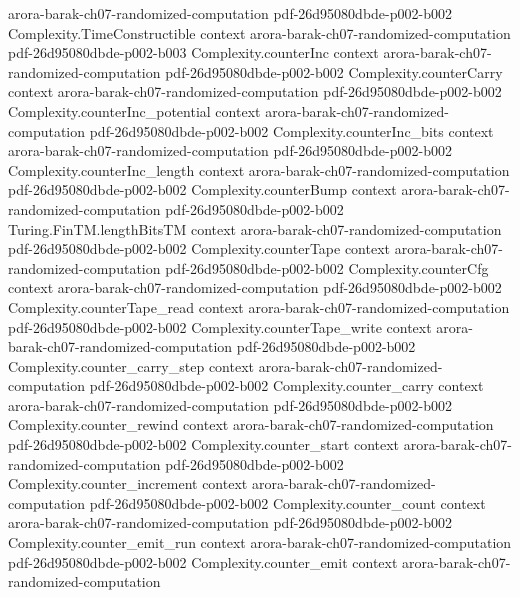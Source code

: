 \begin{theorem}
  {arora-barak-ch07-randomized-computation}
  {pdf-26d95080dbde-p002-b002}
\proofstep
  {Complexity.TimeConstructible}
  {context}
  {arora-barak-ch07-randomized-computation}
  {pdf-26d95080dbde-p002-b003}
\proofstep
  {Complexity.counterInc}
  {context}
  {arora-barak-ch07-randomized-computation}
  {pdf-26d95080dbde-p002-b002}
\proofstep
  {Complexity.counterCarry}
  {context}
  {arora-barak-ch07-randomized-computation}
  {pdf-26d95080dbde-p002-b002}
\proofstep
  {Complexity.counterInc_potential}
  {context}
  {arora-barak-ch07-randomized-computation}
  {pdf-26d95080dbde-p002-b002}
\proofstep
  {Complexity.counterInc_bits}
  {context}
  {arora-barak-ch07-randomized-computation}
  {pdf-26d95080dbde-p002-b002}
\proofstep
  {Complexity.counterInc_length}
  {context}
  {arora-barak-ch07-randomized-computation}
  {pdf-26d95080dbde-p002-b002}
\proofstep
  {Complexity.counterBump}
  {context}
  {arora-barak-ch07-randomized-computation}
  {pdf-26d95080dbde-p002-b002}
\proofstep
  {Turing.FinTM.lengthBitsTM}
  {context}
  {arora-barak-ch07-randomized-computation}
  {pdf-26d95080dbde-p002-b002}
\proofstep
  {Complexity.counterTape}
  {context}
  {arora-barak-ch07-randomized-computation}
  {pdf-26d95080dbde-p002-b002}
\proofstep
  {Complexity.counterCfg}
  {context}
  {arora-barak-ch07-randomized-computation}
  {pdf-26d95080dbde-p002-b002}
\proofstep
  {Complexity.counterTape_read}
  {context}
  {arora-barak-ch07-randomized-computation}
  {pdf-26d95080dbde-p002-b002}
\proofstep
  {Complexity.counterTape_write}
  {context}
  {arora-barak-ch07-randomized-computation}
  {pdf-26d95080dbde-p002-b002}
\proofstep
  {Complexity.counter_carry_step}
  {context}
  {arora-barak-ch07-randomized-computation}
  {pdf-26d95080dbde-p002-b002}
\proofstep
  {Complexity.counter_carry}
  {context}
  {arora-barak-ch07-randomized-computation}
  {pdf-26d95080dbde-p002-b002}
\proofstep
  {Complexity.counter_rewind}
  {context}
  {arora-barak-ch07-randomized-computation}
  {pdf-26d95080dbde-p002-b002}
\proofstep
  {Complexity.counter_start}
  {context}
  {arora-barak-ch07-randomized-computation}
  {pdf-26d95080dbde-p002-b002}
\proofstep
  {Complexity.counter_increment}
  {context}
  {arora-barak-ch07-randomized-computation}
  {pdf-26d95080dbde-p002-b002}
\proofstep
  {Complexity.counter_count}
  {context}
  {arora-barak-ch07-randomized-computation}
  {pdf-26d95080dbde-p002-b002}
\proofstep
  {Complexity.counter_emit_run}
  {context}
  {arora-barak-ch07-randomized-computation}
  {pdf-26d95080dbde-p002-b002}
\proofstep
  {Complexity.counter_emit}
  {context}
  {arora-barak-ch07-randomized-computation}

\end{theorem}
